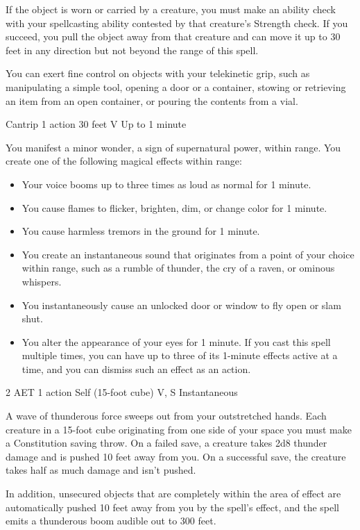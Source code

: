 If the object is worn or carried by a creature, you must make an ability check with your spellcasting ability contested by that creature's Strength check. If you succeed, you pull the object away from that creature and can move it up to 30 feet in any direction but not beyond the range of this spell.

You can exert fine control on objects with your telekinetic grip, such as manipulating a simple tool, opening a door or a container, stowing or retrieving an item from an open container, or pouring the contents from a vial.


{Cantrip}
{1 action}
{30 feet}
{V}
{Up to 1 minute}

You manifest a minor wonder, a sign of supernatural power, within range. You create one of the following magical effects within range:
\begin{itemize}
\item Your voice booms up to three times as loud as normal for 1 minute.
\item You cause flames to flicker, brighten, dim, or change color for 1 minute.
\item You cause harmless tremors in the ground for 1 minute.
\item You create an instantaneous sound that originates from a point of your choice within range, such as a rumble of thunder, the cry of a raven, or ominous whispers.
\item You instantaneously cause an unlocked door or window to fly open or slam shut.
\item You alter the appearance of your eyes for 1 minute. If you cast this spell multiple times, you can have up to three of its 1-minute effects active at a time, and you can dismiss such an effect as an action.
\end{itemize}


{2 AET}
{1 action}
{Self (15-foot cube)}
{V, S}
{Instantaneous}

A wave of thunderous force sweeps out from your outstretched hands. Each creature in a 15-foot cube originating from one side of your space you must make a Constitution saving throw. On a failed save, a creature takes 2d8 thunder damage and is pushed 10 feet away from you. On a successful save, the creature takes half as much damage and isn't pushed.

In addition, unsecured objects that are completely within the area of effect are automatically pushed 10 feet away from you by the spell's effect, and the spell emits a thunderous boom audible out to 300 feet.

